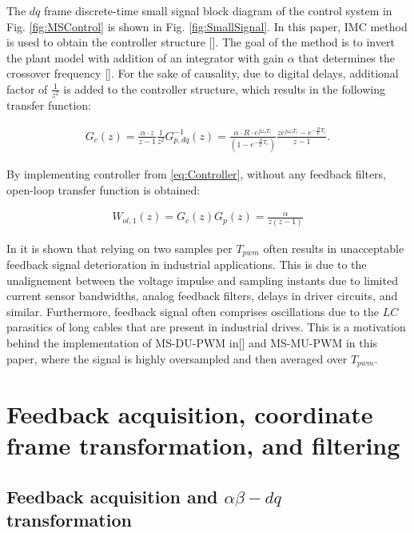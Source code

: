 \documentclass[journal]{IEEEtran}
\begin{document}
The $dq$ frame discrete-time small signal block diagram of the control system in Fig. \ref{fig:MSControl} is shown in Fig. \ref{fig:SmallSignal}. In this paper, IMC method is used to obtain the controller structure []. The goal of the method is to invert the plant model with addition of an integrator with gain $\alpha$ that determines the crossover frequency []. For the sake of causality, due to digital delays, additional factor of $\frac{1}{z^2}$ is added to the controller structure, which results in the following transfer function:

\begin{equation}
\begin{aligned}
G_{c}(z) =  \frac{\alpha \cdot z}{z-1} \frac{1}{z^2} G^{-1}_{p,dq}(z)  =   \frac{\alpha \cdot R \cdot e^{j\omega_o T_c}}{\left( 1 - e^{-\frac{R}{L}T_c}\right)}\frac{z e^{j\omega_o T_c}-e^{-\frac{R}{L}T_c}}{z-1}.
\label{eq:Controller} 
\end{aligned}    
\end{equation}

By implementing controller from \eqref{eq:Controller}, without any feedback filters, open-loop transfer function is obtained:

\begin{equation}
\begin{aligned}
W_{ol,1}(z) = G_c(z) G_p(z) =  \frac{\alpha}{z(z-1)}
\label{eq:OpenLoop} 
\end{aligned}    
\end{equation}

In \cite{vuksa2016} it is shown that relying on two samples per $T_{pwm}$ often results in unacceptable feedback signal deterioration in industrial applications. This is due to the unalignement between the voltage impulse and sampling instants due to limited current sensor bandwidths, analog feedback filters, delays in driver circuits, and similar. Furthermore, feedback signal often comprises oscillations due to the $LC$ parasitics of long cables that are present in industrial drives. This is a motivation behind the implementation of MS-DU-PWM in[] and MS-MU-PWM in this paper, where the signal is highly oversampled and then averaged over $T_{pwm}$.

\section{Feedback acquisition, coordinate frame transformation, and filtering}

\subsection{Feedback acquisition and $\alpha \beta - dq$ transformation}
\end{document}
